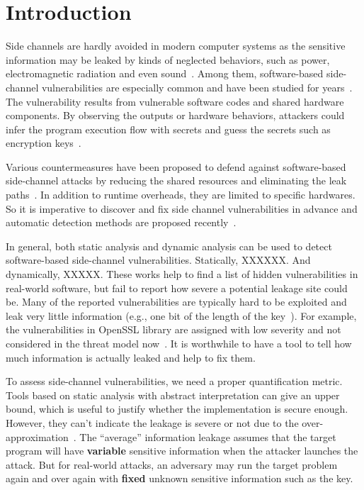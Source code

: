 \section{Introduction}
Side channels are hardly avoided in modern computer systems as the sensitive information 
may be leaked by kinds of neglected behaviors, 
such as power, electromagnetic radiation and even sound~\cite{}. 
Among them, software-based side-channel vulnerabilities are especially common and have been studied for years~\cite{}. 
The vulnerability results from vulnerable software codes and shared hardware components.
By observing the outputs or hardware behaviors, attackers could 
infer the program execution flow with secrets and guess the secrets such as encryption keys~\cite{}.

Various countermeasures have been proposed to defend against 
software-based side-channel attacks by reducing the shared resources
and eliminating the leak paths~\cite{182946,203878,217537}. 
In addition to runtime overheads, they are limited to specific hardwares. 
So it is imperative to discover and fix side channel vulnerabilities in advance 
and automatic detection methods are proposed recently~\cite{}.

In general, both static analysis and dynamic analysis
can be used to detect software-based side-channel vulnerabilities.
Statically, XXXXXX. And dynamically, XXXXX.
These works help to find a list of hidden vulnerabilities in real-world software, 
but fail to report how severe a potential leakage site could be. 
Many of the reported vulnerabilities are typically hard to be exploited 
and leak very little information (e.g., one bit of the length of the key~\cite{203878}).  
For example, the vulnerabilities in OpenSSL library are assigned with low severity and not considered 
in the threat model now~\cite{https://www.openssl.org/policies/secpolicy.html}. 
It is worthwhile to have a tool to tell how much information is actually leaked and help to fix them.

To assess side-channel vulnerabilities, we need a proper quantification metric.
Tools based on static analysis with abstract interpretation can give an upper bound, 
which is useful to justify whether the implementation is secure enough. 
However, they can’t indicate the leakage is severe or not due to the over-approximation~\cite{}. 
The ``average'' information leakage assumes that the target program will have \textbf{variable} sensitive 
information when the attacker launches the attack.
But for real-world attacks, an adversary may run the target problem again and over again 
with \textbf{fixed} unknown sensitive information such as the key.
 

